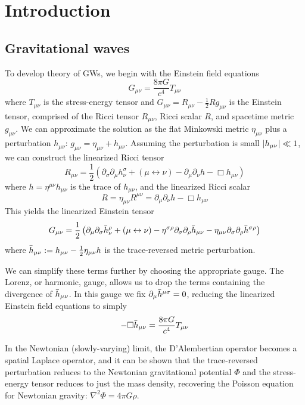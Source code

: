 \chapter{Introduction}

\section{Gravitational waves}

To develop theory of \acp{GW}, we begin with the Einstein field equations
$$G_{\mu\nu} = \frac{8\pi G}{c^4} T_{\mu\nu}$$
where $T_{\mu\nu}$ is the stress-energy tensor and $G_{\mu\nu} = R_{\mu\nu} - \frac{1}{2} R g_{\mu\nu}$ is the Einstein tensor, comprised of the Ricci tensor $R_{\mu\nu}$, Ricci scalar $R$, and spacetime metric $g_{\mu\nu}$. We can approximate the solution as the flat Minkowski metric $\eta_{\mu\nu}$ plus a perturbation $h_{\mu\nu}$: $g_{\mu \nu} = \eta_{\mu \nu} + h_{\mu \nu}$. Assuming the perturbation is small $\abs{h_{\mu\nu}} \ll 1$, we can construct the linearized Ricci tensor
$$R_{\mu\nu} = \frac{1}{2} (\partial_{\sigma}\partial_{\mu}h_{\nu}^{\sigma} + (\mu \leftrightarrow \nu) - \partial_{\mu}\partial_{\nu}h - \Box h_{\mu\nu})$$
where $h = \eta^{\mu\nu}h_{\mu\nu}$ is the trace of $h_{\mu\nu}$, and the linearized Ricci scalar
$$R = \eta_{\mu\nu}R^{\mu\nu} = \partial_{\mu}\partial_{\nu}h - \Box h_{\mu\nu}$$
This yields the linearized Einstein tensor
$$G_{\mu\nu} = \frac{1}{2} \left( \partial_{\mu}\partial_{\sigma}\Bar{h}_{\nu}^{\rho} + (\mu \leftrightarrow \nu) - \eta^{\sigma\rho}\partial_{\sigma}\partial_{\rho}\Bar{h}_{\mu\nu} - \eta_{\mu\nu}\partial_{\sigma}\partial_{\rho}\Bar{h}^{\sigma\rho} \right)$$
where $\Bar{h}_{\mu\nu} := h_{\mu\nu} - \frac{1}{2}\eta_{\mu\nu}h$ is the trace-reversed metric perturbation.

We can simplify these terms further by choosing the appropriate gauge. The Lorenz, or harmonic, gauge, allows us to drop the terms containing the divergence of $\Bar{h}_{\mu\nu}$. In this gauge we fix $\partial_{\mu}\Bar{h}^{\mu\sigma} = 0$, reducing the linearized Einstein field equations to simply
\begin{equation}\label{eq:EFE}
	-\Box \Bar{h}_{\mu\nu} = \frac{8\pi G}{c^4} T_{\mu\nu}
\end{equation}

In the Newtonian (slowly-varying) limit, the D'Alembertian operator becomes a spatial Laplace operator, and it can be shown that the trace-reversed perturbation reduces to the Newtonian gravitational potential $\Phi$ and the stress-energy tensor reduces to just the mass density, recovering the Poisson equation for Newtonian gravity: $\nabla^2\Phi = 4\pi G\rho$.


